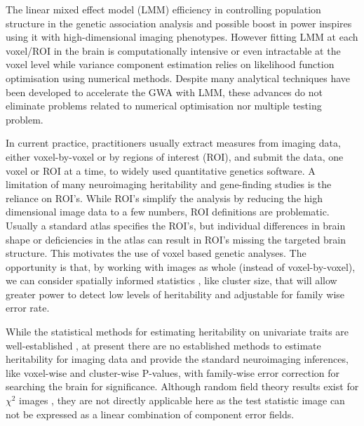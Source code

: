  
The linear mixed effect model (LMM) efficiency in controlling population structure in the genetic association analysis and possible boost in power inspires using it with high-dimensional imaging phenotypes. However fitting LMM at each voxel/ROI in the brain is computationally intensive or even intractable at the voxel level while variance component estimation relies on likelihood function optimisation using numerical methods. Despite many analytical techniques have been developed to accelerate the GWA with LMM, these advances do not eliminate problems related to numerical optimisation  nor multiple testing problem. 





In  current practice, practitioners usually extract  measures from imaging data, either voxel-by-voxel or by regions of interest (ROI), and submit the data, one voxel or ROI at a time, to widely used  quantitative genetics software.  A limitation of many neuroimaging heritability and gene-finding studies is the reliance on ROI's. While ROI's simplify the analysis by reducing the high dimensional image data to a few numbers, ROI definitions are problematic. Usually
a standard atlas specifies the ROI's, but individual differences in brain shape or
deficiencies in the atlas can result in ROI's missing the targeted brain structure. This motivates the use of voxel based genetic analyses. The opportunity is that, by working with images as whole (instead of voxel-by-voxel), we can consider spatially informed statistics , like cluster size, that will allow greater power to detect low levels of heritability and adjustable for family wise error rate. 

While the statistical methods for estimating heritability on univariate traits are well-established \citep{Almasy1998,Blangero1997,Amos1994,HOPPER1983},  at present there are no established methods to estimate heritability for imaging data and provide the standard neuroimaging inferences, like voxel-wise and cluster-wise P-values, with family-wise error correction for searching the brain for significance.  Although random field theory \citep{Worsley1992a,Friston1994,Nichols2003} results exist for $\chi^2$ images \citep{Cao1999}, they are not directly applicable here as the test statistic image can not be expressed as a linear combination of component error fields. 




